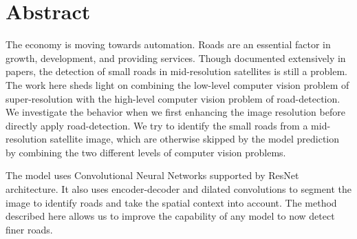 \chapter*{Abstract}
The economy is moving towards automation. Roads are an essential factor in growth, development, and providing services. Though documented extensively in papers, the detection of small roads in mid-resolution satellites is still a problem. The work here sheds light on combining the low-level computer vision problem of super-resolution with the high-level computer vision problem of road-detection. We investigate the behavior when we first enhancing the image resolution before directly apply road-detection. We try to identify the small roads from a mid-resolution satellite image, which are otherwise skipped by the model prediction by combining the two different levels of computer vision problems.

The model uses Convolutional Neural Networks supported by ResNet architecture. It also uses encoder-decoder and dilated convolutions to segment the image to identify roads and take the spatial context into account. The method described here allows us to improve the capability of any model to now detect finer roads.
